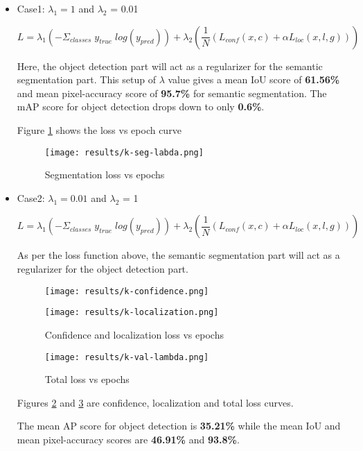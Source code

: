 \begin{itemize}
    \item Case1: $\lambda_{1}=1$ and $\lambda_{2}$ = 0.01
    
\begin{equation}
    L = \lambda_{1} (-\Sigma_{classes}\;y_{true}\;log(y_{pred})) + \lambda_{2}(\frac{1}{N} (L_{conf} (x,c) + \alpha L_{loc} (x,l,g))) 
\end{equation}

Here, the object detection part will act as a regularizer for the semantic segmentation part. This setup of $\lambda$ value gives a mean IoU score of \textbf{61.56\%} and mean pixel-accuracy score of \textbf{95.7\%} for semantic segmentation. The mAP score for object detection drops down to only \textbf{0.6\%}.

Figure \ref{k-seg-lambda} shows the loss vs epoch curve

\begin{figure}[h!]
    \centering
    \texttt{[image: results/k-seg-labda.png]}
    \caption{Segmentation loss vs epochs}
    \label{k-seg-lambda}
\end{figure}

\newpage
\item Case2: $\lambda_{1}=0.01$ and $\lambda_{2}$ = 1

\begin{equation}
    L = \lambda_{1} (-\Sigma_{classes}\;y_{true}\;log(y_{pred})) + \lambda_{2}(\frac{1}{N} (L_{conf} (x,c) + \alpha L_{loc} (x,l,g))) 
\end{equation}

As per the loss function above, the semantic segmentation part will act as a regularizer for the object detection part.

\begin{figure}[h!]
\begin{multicols}{2}
    \texttt{[image: results/k-confidence.png]}\par \texttt{[image: results/k-localization.png]}\par
    \end{multicols}
\caption{Confidence and localization loss vs epochs}
\label{k_conf_loc}
\end{figure}

\begin{figure}[h!]
\centering
    \texttt{[image: results/k-val-lambda.png]}
    \caption{Total loss vs epochs}
    \label{k_totallosslambda}
\end{figure}

Figures \ref{k_conf_loc} and \ref{k_totallosslambda} are confidence, localization and total loss curves. 
\par
The mean AP score for object detection is \textbf{35.21\%} while the mean IoU and mean pixel-accuracy scores are \textbf{46.91\%} and \textbf{93.8\%}.

\end{itemize}


